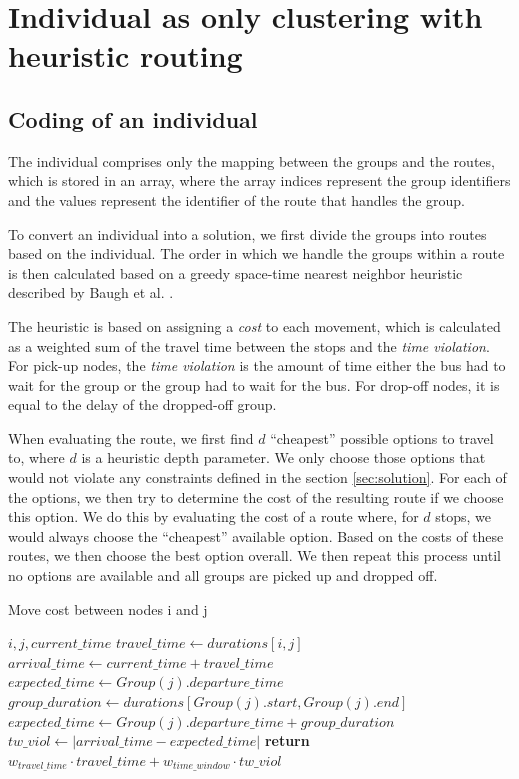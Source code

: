 \section{Individual as only clustering with heuristic routing}\label{sec:evoh}

\subsection{Coding of an individual}

The individual comprises only the mapping between the groups and the routes, which is stored in an array, where the array indices represent the group identifiers and the values represent the identifier of the route that handles the group.

To convert an individual into a solution, we first divide the groups into routes based on the individual. The order in which we handle the groups within a route is then calculated based on a greedy space-time nearest neighbor heuristic described by Baugh et al. \cite{Baugh1998INTRACTABILITYOT}.

The heuristic is based on assigning a \textit{cost} to each movement, which is calculated as a weighted sum of the travel time between the stops and the
\textit{time violation}. For pick-up nodes, the \textit{time violation} is the amount of time either the bus had to wait for the group or the group had to wait for the bus. For drop-off nodes, it is equal to the delay of the dropped-off group.

When evaluating the route, we first find $d$ ``cheapest'' possible options to travel to, where $d$ is a heuristic depth parameter. We only choose those options that would not violate any constraints defined in the section \ref{sec:solution}. For each of the options, we then try to determine the cost of the resulting route if we choose this option. We do this by evaluating the cost of a route where, for $d$ stops, we would always choose the ``cheapest'' available option. Based on the costs of these routes, we then choose the best option overall. We then repeat this process until no options are available and all groups are picked up and dropped off.

\begin{algorithm}
\caption{Move cost between nodes i and j}
\label{alg:evoh_move_cost}
\begin{algorithmic}
\Require $i, j, current\_time$
\State $travel\_time \gets durations[i, j]$
\State $arrival\_time \gets current\_time + travel\_time$
    \State $expected\_time \gets Group(j).departure\_time$
\Else
    \State $group\_duration \gets durations[Group(j).start, Group(j).end]$
    \State $expected\_time \gets Group(j).departure\_time + group\_duration$
\EndIf
\State $tw\_viol \gets |arrival\_time - expected\_time|$
\State \textbf{return} $w_{travel\_time} \cdot travel\_time + w_{time\_window} \cdot tw\_viol$
\end{algorithmic}
\end{algorithm}


